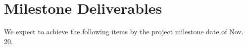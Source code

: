 \section{Milestone Deliverables}

We expect to achieve the following items by the project milestone date of Nov. 20.


